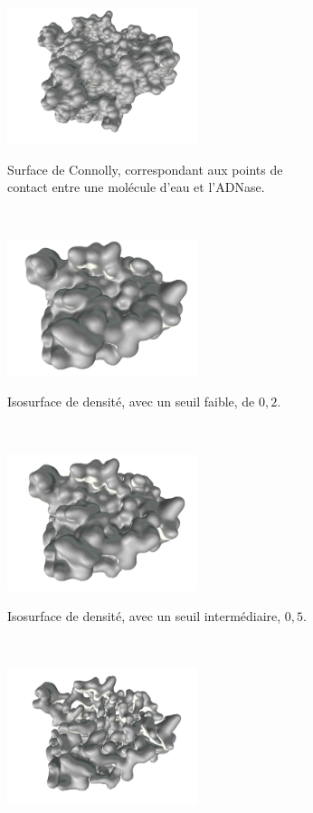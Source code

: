 	\newcommand{\subImgW}{0.5\textwidth}
	\begin{figure}[H]
        \begin{subfigure}[t]{\subImgW}
            \centering
            {\includegraphics[height=4cm]{./figures/ch1/4awn_sas}}
            \caption{Surface de Connolly, correspondant aux points de contact entre une molécule d'eau et l'ADNase.}
            \label{fig:4awn_connolly}
        \end{subfigure}
        ~
        \begin{subfigure}[t]{\subImgW}
            \centering
            {\includegraphics[height=4cm]{./figures/ch1/4awn_iso_0_2}}
            \caption{Isosurface de densité, avec un seuil faible, de $0,2$.}
            \label{fig:4awn_iso_0_2}
        \end{subfigure}
        ~
        \begin{subfigure}[t]{\subImgW}
            \centering
            {\includegraphics[height=4cm]{./figures/ch1/4awn_iso_0_5}}
            \caption{Isosurface de densité, avec un seuil intermédiaire, $0,5$.}
            \label{fig:4awn_iso_0_5}
        \end{subfigure}
        ~
        \begin{subfigure}[t]{\subImgW}
            \centering
            {\includegraphics[height=4cm]{./figures/ch1/4awn_iso_1_5}}

\end{subfigure}
\end{figure}
